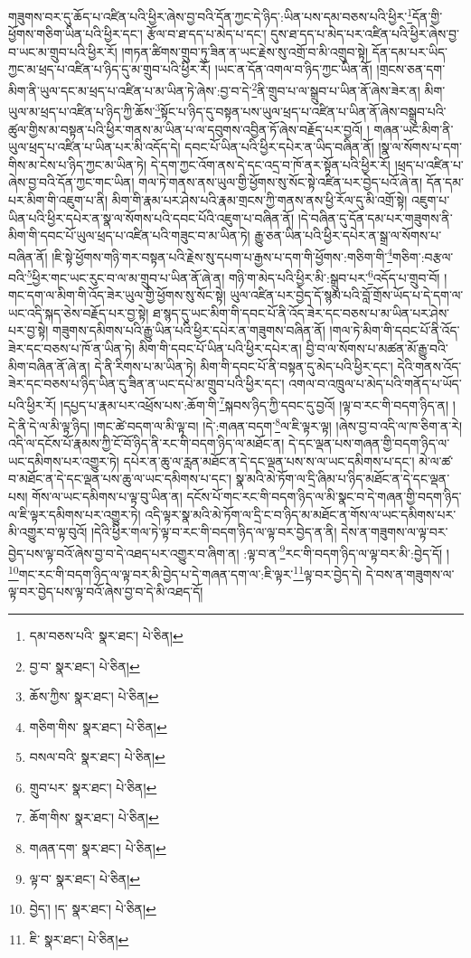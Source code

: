 གཟུགས་བར་དུ་ཆོད་པ་འཛིན་པའི་ཕྱིར་ཞེས་བྱ་བའི་དོན་ཀྱང་དེ་ཉིད་:ཡིན་པས་དམ་བཅས་པའི་ཕྱིར་\footnote{དམ་བཅས་པའི་  སྣར་ཐང་།  པེ་ཅིན། }དོན་གྱི་ཕྱོགས་གཅིག་ཡིན་པའི་ཕྱིར་དང་། རྩོལ་བ་ཐ་དད་པ་མེད་པ་དང་། དུས་ཐ་དད་པ་མེད་པར་འཛིན་པའི་ཕྱིར་ཞེས་བྱ་བ་ཡང་མ་གྲུབ་པའི་ཕྱིར་རོ། །གཏན་ཚིགས་གྲུབ་ཏུ་ཟིན་ན་ཡང་རྗེས་སུ་འགྲོ་བ་མི་འགྲུབ་སྟེ། དོན་དམ་པར་ཡིད་ཀྱང་མ་ཕྲད་པ་འཛིན་པ་ཉིད་དུ་མ་གྲུབ་པའི་ཕྱིར་རོ། །ཡང་ན་དོན་འགལ་བ་ཉིད་ཀྱང་ཡིན་ནོ། །གྲངས་ཅན་དག་མིག་ནི་ཡུལ་དང་མ་ཕྲད་པ་འཛིན་པ་མ་ཡིན་ཏེ་ཞེས་:བྱ་བ་དེ་\footnote{བྱ་བ་  སྣར་ཐང་།  པེ་ཅིན། }ནི་གྲུབ་པ་ལ་སྒྲུབ་པ་ཡིན་ནོ་ཞེས་ཟེར་ན། མིག་ཡུལ་མ་ཕྲད་པ་འཛིན་པ་ཉིད་ཀྱི་ཆོས་\footnote{ཆོས་ཀྱིས་  སྣར་ཐང་།  པེ་ཅིན། }སྟོང་པ་ཉིད་དུ་བསྟན་པས་ཡུལ་ཕྲད་པ་འཛིན་པ་ཡིན་ནོ་ཞེས་བསྒྲུབ་པའི་ཚུལ་གྱིས་མ་བསྟན་པའི་ཕྱིར་གནས་མ་ཡིན་པ་ལ་དབུགས་འབྱིན་ཏོ་ཞེས་བརྗོད་པར་བྱའོ། །
གཞན་ཡང་མིག་ནི་ཡུལ་ཕྲད་པ་འཛིན་པ་ཡིན་པར་མི་འདོད་དེ། དབང་པོ་ཡིན་པའི་ཕྱིར་དཔེར་ན་ཡིད་བཞིན་ནོ། །སྣ་ལ་སོགས་པ་དག་གིས་མ་ངེས་པ་ཉིད་ཀྱང་མ་ཡིན་ཏེ། དེ་དག་ཀྱང་འོག་ནས་དེ་དང་འདྲ་བ་ཁོ་ནར་སྟོན་པའི་ཕྱིར་རོ། །ཕྲད་པ་འཛིན་པ་ཞེས་བྱ་བའི་དོན་ཀྱང་གང་ཡིན། གལ་ཏེ་གནས་ནས་ཡུལ་གྱི་ཕྱོགས་སུ་སོང་སྟེ་འཛིན་པར་བྱེད་པའོ་ཞེ་ན། དོན་དམ་པར་མིག་གི་འཇུག་པ་ནི། མིག་གི་རྣམ་པར་ཤེས་པའི་རྣམ་གྲངས་ཀྱི་གནས་ནས་ཕྱི་རོལ་དུ་མི་འགྲོ་སྟེ། འཇུག་པ་ཡིན་པའི་ཕྱིར་དཔེར་ན་སྣ་ལ་སོགས་པའི་དབང་པོའི་འཇུག་པ་བཞིན་ནོ། །དེ་བཞིན་དུ་དོན་དམ་པར་གཟུགས་ནི་མིག་གི་དབང་པོ་ཡུལ་ཕྲད་པ་འཛིན་པའི་གཟུང་བ་མ་ཡིན་ཏེ། རྒྱུ་ཅན་ཡིན་པའི་ཕྱིར་དཔེར་ན་སྒྲ་ལ་སོགས་པ་བཞིན་ནོ། །ཇི་སྟེ་ཕྱོགས་གཉི་གར་བསྟན་པའི་རྗེས་སུ་དཔག་པ་རྒྱས་པ་དག་གི་ཕྱོགས་:གཅིག་གི་\footnote{གཅིག་གིས་  སྣར་ཐང་།  པེ་ཅིན། }གཅིག་:བརྩལ་བའི་\footnote{བསལ་བའི་  སྣར་ཐང་།  པེ་ཅིན། }ཕྱིར་གང་ཡང་རུང་བ་ལ་མ་གྲུབ་པ་ཡིན་ནོ་ཞེ་ན། གཉི་ག་མེད་པའི་ཕྱིར་མི་:སྒྲུབ་པར་\footnote{གྲུབ་པར་  སྣར་ཐང་།  པེ་ཅིན། }འདོད་པ་གྲུབ་བོ། །གང་དག་ལ་མིག་གི་འོད་ཟེར་ཡུལ་གྱི་ཕྱོགས་སུ་སོང་སྟེ། ཡུལ་འཛིན་པར་བྱེད་དོ་སྙམ་པའི་བློ་གྲོས་ཡོད་པ་དེ་དག་ལ་ཡང་འདི་སྐད་ཅེས་བརྗོད་པར་བྱ་སྟེ། ཐ་སྙད་དུ་ཡང་མིག་གི་དབང་པོ་ནི་འོད་ཟེར་དང་བཅས་པ་མ་ཡིན་པར་ཤེས་པར་བྱ་སྟེ། གཟུགས་དམིགས་པའི་རྒྱུ་ཡིན་པའི་ཕྱིར་དཔེར་ན་གཟུགས་བཞིན་ནོ། །གལ་ཏེ་མིག་གི་དབང་པོ་ནི་འོད་ཟེར་དང་བཅས་པ་ཁོ་ན་ཡིན་ཏེ། མིག་གི་དབང་པོ་ཡིན་པའི་ཕྱིར་དཔེར་ན། བྱི་བ་ལ་སོགས་པ་མཚན་མོ་རྒྱུ་བའི་མིག་བཞིན་ནོ་ཞེ་ན། དེ་ནི་རིགས་པ་མ་ཡིན་ཏེ། མིག་གི་དབང་པོ་ནི་བསྟན་དུ་མེད་པའི་ཕྱིར་དང་། དེའི་གནས་འོད་ཟེར་དང་བཅས་པ་ཉིད་ཡིན་དུ་ཟིན་ན་ཡང་དཔེ་མ་གྲུབ་པའི་ཕྱིར་དང་། འགལ་བ་འཁྲུལ་པ་མེད་པའི་གནོད་པ་ཡོད་པའི་ཕྱིར་རོ། །དཔྱད་པ་རྣམ་པར་འཕྲོས་པས་:ཆོག་གི་\footnote{ཆོག་གིས་  སྣར་ཐང་།  པེ་ཅིན། }སྐབས་ཉིད་ཀྱི་དབང་དུ་བྱའོ། །ལྟ་བ་རང་གི་བདག་ཉིད་ན། །དེ་ནི་དེ་ལ་མི་ལྟ་ཉིད། །གང་ཚེ་བདག་ལ་མི་ལྟ་བ། །དེ་:གཞན་བདག་\footnote{གཞན་དག་  སྣར་ཐང་།  པེ་ཅིན། }ལ་ཇི་ལྟར་ལྟ། །ཞེས་བྱ་བ་འདི་ལ་ཁ་ཅིག་ན་རེ། འདི་ལ་དངོས་པོ་རྣམས་ཀྱི་ངོ་བོ་ཉིད་ནི་རང་གི་བདག་ཉིད་ལ་མཐོང་ན། དེ་དང་ལྡན་པས་གཞན་གྱི་བདག་ཉིད་ལ་ཡང་དམིགས་པར་འགྱུར་ཏེ། དཔེར་ན་ཆུ་ལ་རླན་མཐོང་ན་དེ་དང་ལྡན་པས་ས་ལ་ཡང་དམིགས་པ་དང་། མེ་ལ་ཚ་བ་མཐོང་ན་དེ་དང་ལྡན་པས་ཆུ་ལ་ཡང་དམིགས་པ་དང་། སྣ་མའི་མེ་ཏོག་ལ་དྲི་ཞིམ་པ་ཉིད་མཐོང་ན་དེ་དང་ལྡན་པས། གོས་ལ་ཡང་དམིགས་པ་ལྟ་བུ་ཡིན་ན། དངོས་པོ་གང་རང་གི་བདག་ཉིད་ལ་མི་སྣང་བ་དེ་གཞན་གྱི་བདག་ཉིད་ལ་ཇི་ལྟར་དམིགས་པར་འགྱུར་ཏེ། འདི་ལྟར་སྣ་མའི་མེ་ཏོག་ལ་དྲི་ང་བ་ཉིད་མ་མཐོང་ན་གོས་ལ་ཡང་དམིགས་པར་མི་འགྱུར་བ་ལྟ་བུའོ། །དེའི་ཕྱིར་གལ་ཏེ་ལྟ་བ་རང་གི་བདག་ཉིད་ལ་ལྟ་བར་བྱེད་ན་ནི། དེས་ན་གཟུགས་ལ་ལྟ་བར་བྱེད་པས་ལྟ་བའོ་ཞེས་བྱ་བ་དེ་འཐད་པར་འགྱུར་བ་ཞིག་ན། :ལྟ་བ་ན་\footnote{ལྟ་བ་  སྣར་ཐང་།  པེ་ཅིན། }རང་གི་བདག་ཉིད་ལ་ལྟ་བར་མི་:བྱེད་དོ། །\footnote{བྱེད་། །ད་  སྣར་ཐང་།  པེ་ཅིན། }གང་རང་གི་བདག་ཉིད་ལ་ལྟ་བར་མི་བྱེད་པ་དེ་གཞན་དག་ལ་:ཇི་ལྟར་\footnote{ཇི་  སྣར་ཐང་།  པེ་ཅིན། }ལྟ་བར་བྱེད་དེ། དེ་བས་ན་གཟུགས་ལ་ལྟ་བར་བྱེད་པས་ལྟ་བའོ་ཞེས་བྱ་བ་དེ་མི་འཐད་དོ། 
